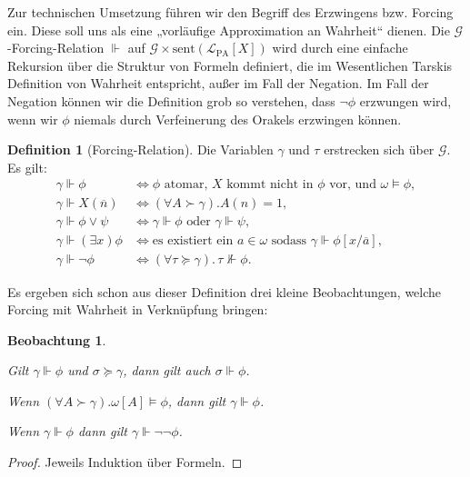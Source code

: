 \documentclass[nofonts]{uebung}
\newtheorem{observation}[theorem]{Beobachtung}
\theoremstyle{definition}
\newtheorem{definition}[theorem]{Definition}
\begin{document}
Zur technischen Umsetzung führen wir den Begriff des Erzwingens bzw. Forcing ein.
Diese soll uns als eine „vorläufige Approximation an Wahrheit“ dienen.
Die $\mathcal G$-Forcing-Relation $\Vdash$ auf $\mathcal G\times \mathrm{sent}(\mathcal L_{\mathrm{PA}}[X])$  wird durch eine einfache Rekursion über die Struktur von Formeln definiert, die im Wesentlichen Tarskis Definition von Wahrheit entspricht, außer im Fall der Negation.  Im Fall der Negation können wir die Definition grob so verstehen, dass $\neg\phi$ erzwungen wird, wenn wir $\phi$ niemals durch Verfeinerung des Orakels erzwingen können.

\begin{definition}[Forcing-Relation]
Die Variablen $\gamma$ und $\tau$ erstrecken sich über $\mathcal G$. Es gilt:
\begin{align*}
    \gamma\Vdash\phi &\iff \text{$\phi$ atomar, $X$ kommt nicht in $\phi$ vor, und $\omega\vDash\phi$},\\
    \gamma\Vdash X(\overline n)&\iff(\forall A\succ\gamma).A(n)=1,\\
    \gamma\Vdash \phi\lor\psi &\iff\gamma\Vdash\phi\text{ oder } \gamma\Vdash \psi,\\
    \gamma\Vdash(\exists x)\phi &\iff \text{es existiert ein $a\in\omega$ sodass } \gamma\Vdash \phi[x/\overline{a}],\\
    \gamma\Vdash \neg\phi &\iff (\forall \tau\succeq \gamma).\,\tau\not\Vdash\phi.
\end{align*}
\end{definition}

Es ergeben sich schon aus dieser Definition drei kleine Beobachtungen, welche Forcing mit Wahrheit in Verknüpfung bringen:
\begin{observation}
    \begin{thmenum}
    \item \label{obs:forcing-extension} Gilt $\gamma\Vdash\phi$ und $\sigma\succeq \gamma$, dann gilt auch $\sigma\Vdash \phi$.
    \item \label{obs:forcing-by-universaity} Wenn $(\forall A\succ \gamma).\omega[A]\vDash\phi$, dann gilt $\gamma\Vdash\phi$.
    \item Wenn $\gamma\Vdash\phi$ dann gilt $\gamma\Vdash\neg\neg\phi$.
    \end{thmenum}
\end{observation}
\begin{proof}
    Jeweils Induktion über Formeln. 
\end{proof}
\end{document}
